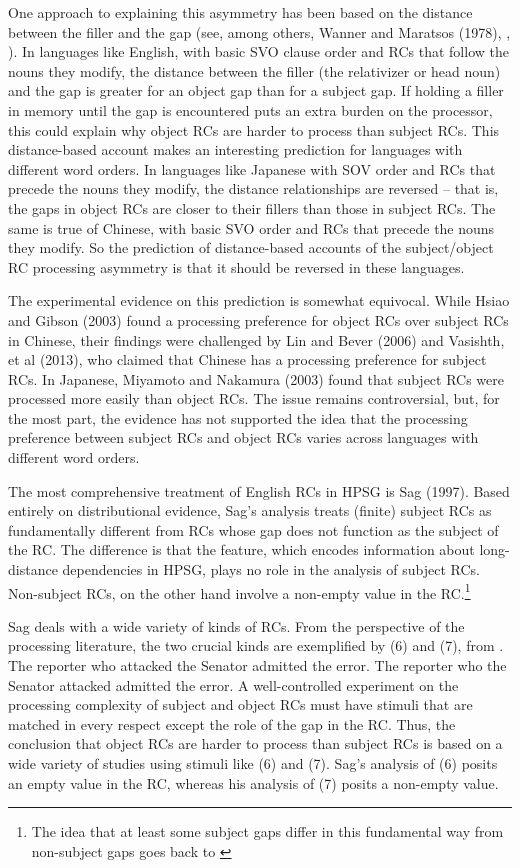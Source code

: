 \documentclass[a4paper]{article}
\begin{document}
One approach to explaining this asymmetry has been based on the distance between the filler and the gap (see, among others, Wanner and Maratsos (1978), \citet{Gibson98a}, \citet{Hawkins2004a-u}).  In languages like English, with basic SVO clause order and RCs that follow the nouns they modify, the distance between the filler (the relativizer or head noun) and the gap is greater for an object gap than for a subject gap.  If holding a filler in memory until the gap is encountered puts an extra burden on the processor, this could explain why object RCs are harder to process than subject RCs.   This distance-based account makes an interesting prediction for languages with different word orders.  In languages like Japanese with SOV order and RCs that precede the nouns they modify, the distance relationships are reversed -- that is, the gaps in object RCs are closer to their fillers than those in subject RCs.  The same is true of Chinese, with basic SVO order and RCs that precede the nouns they modify.  So the prediction of distance-based accounts of the subject/object RC processing asymmetry is that it should be reversed in these languages.

The experimental evidence on this prediction is somewhat equivocal.  While Hsiao and Gibson (2003) found a processing preference for object RCs over subject RCs in Chinese, their findings were challenged by Lin and Bever (2006) and Vasishth, et al (2013), who claimed that Chinese has a processing preference for subject RCs.  In Japanese, Miyamoto and Nakamura (2003) found that subject RCs were processed more easily than object RCs.  The issue remains controversial, but, for the most part, the evidence has not supported the idea that the processing preference between subject RCs and object RCs varies across languages with different word orders.

The most comprehensive treatment of English RCs in HPSG is Sag (1997). Based entirely on distributional evidence, Sag's analysis treats (finite) subject RCs as fundamentally different from RCs whose gap does not function as the subject of the RC.  The difference is that the \slasch feature, which encodes information about long-distance dependencies in HPSG, plays no role in the analysis of subject RCs.  Non-subject RCs, on the other hand involve a non-empty \slasch value in the RC.\footnote{The idea that at least some subject gaps differ in this fundamental way from non-subject gaps goes back to \citet{Gazdar81}}   

Sag deals with a wide variety of kinds of RCs. From the perspective of the processing literature, the two crucial kinds are exemplified by (6) and (7), from \citet{Gibson98a}.
\eal
\ex The reporter who attacked the Senator admitted the error.
\ex The reporter who the Senator attacked admitted the error.
\zl
A well-controlled experiment on the processing complexity of subject and object RCs must have stimuli that are matched in every respect except the role of the gap in the RC.  Thus, the conclusion that object RCs are harder to process than subject RCs is based on a wide variety of studies using stimuli like (6) and (7).  Sag's analysis of (6) posits an empty \slasch value in the RC, whereas his analysis of (7) posits a non-empty \slasch value.  
\end{document}
